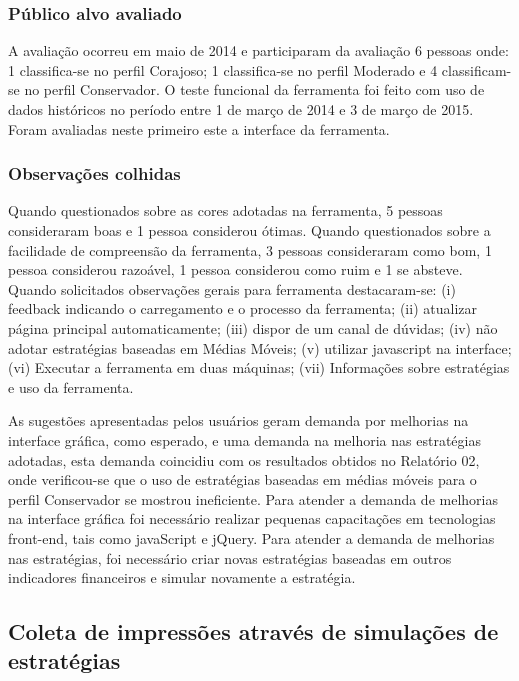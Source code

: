 \subsubsection{Público alvo avaliado}

A avaliação ocorreu em maio de 2014 e participaram da avaliação 6 pessoas onde: 1 classifica-se no perfil Corajoso; 1 classifica-se no perfil Moderado e 4 classificam-se no perfil Conservador. O teste funcional da ferramenta foi feito com uso de dados históricos no período entre 1 de março de 2014 e 3 de março de 2015. Foram avaliadas neste primeiro este a interface da ferramenta.

\subsubsection{Observações colhidas}

Quando questionados sobre as cores adotadas na ferramenta, 5 pessoas consideraram boas e 1 pessoa considerou ótimas. Quando questionados sobre a facilidade de compreensão da ferramenta, 3 pessoas consideraram como bom, 1 pessoa considerou razoável, 1 pessoa considerou como ruim e 1 se absteve. Quando solicitados observações gerais para ferramenta destacaram-se: (i) feedback indicando o carregamento e o processo da ferramenta; (ii) atualizar página principal automaticamente; (iii) dispor de um canal de dúvidas; (iv) não adotar estratégias baseadas em Médias Móveis; (v) utilizar javascript na interface; (vi) Executar a ferramenta em duas máquinas; (vii) Informações sobre estratégias e uso da ferramenta.

As sugestões apresentadas pelos usuários geram demanda por melhorias na interface gráfica, como esperado, e uma demanda na melhoria nas estratégias adotadas, esta demanda coincidiu com os resultados obtidos no Relatório 02, onde verificou-se que o uso de estratégias baseadas em médias móveis para o perfil Conservador se mostrou ineficiente. Para atender a demanda de melhorias na interface gráfica foi necessário realizar pequenas capacitações em tecnologias front-end, tais como javaScript e jQuery. Para atender a demanda de melhorias nas estratégias, foi necessário criar novas estratégias baseadas em outros indicadores financeiros e simular novamente a estratégia.

\subsection{Coleta de impressões através de simulações de estratégias}

